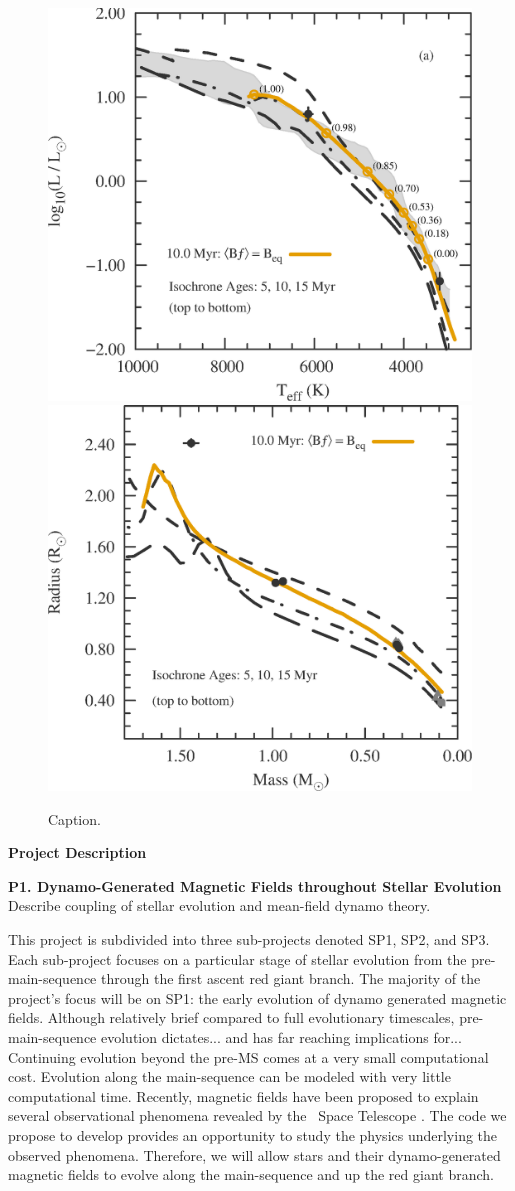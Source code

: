 \documentclass[12pt,a4paper]{article}
\begin{document}
\begin{figure}
	\centering
	\includegraphics[width=0.45\linewidth]{./fig/USco_HR_diagram.eps} \qquad
	\includegraphics[width=0.45\linewidth]{./fig/USco_MR_diagram.eps}
	\caption{Caption.}
	\label{fig:usco}
\end{figure}

{\bf \large Project Description}

\textbf{P1. Dynamo-Generated Magnetic Fields throughout Stellar Evolution} \\
Describe coupling of stellar evolution and mean-field dynamo theory. 

This project is subdivided into three sub-projects denoted SP1, SP2, and SP3. Each sub-project focuses on a particular stage of stellar evolution from the pre-main-sequence through the first ascent red giant branch. The majority of the project's focus will be on SP1: the early evolution of dynamo generated magnetic fields. Although relatively brief compared to full evolutionary timescales, pre-main-sequence evolution dictates... and has far reaching implications for... Continuing evolution beyond the pre-MS comes at a very small computational cost. Evolution along the main-sequence can be modeled with very little computational time. Recently, magnetic fields have been proposed to explain several observational phenomena revealed by the \kepler\ Space Telescope \citep{Fuller2015, vanSaders2016}. The code we propose to develop provides an opportunity to study the physics underlying the observed phenomena. Therefore, we will allow stars and their dynamo-generated magnetic fields to evolve along the main-sequence and up the red giant branch. 
\end{document}
